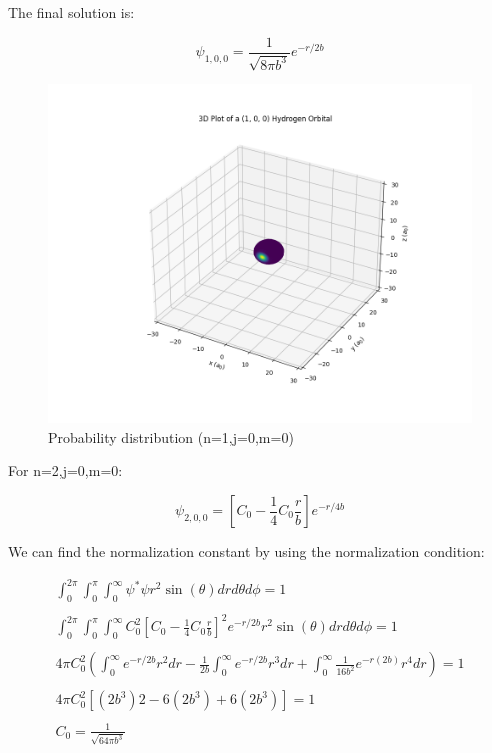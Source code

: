 The final solution is:

\begin{equation}
  \psi_{1,0,0} = \frac{1}{\sqrt{8\pi b^3}} e^{-r/2b}
\end{equation}


\begin{figure}[H]
  \centering
  \includegraphics{images9/3d_plot_1,0,0.png}
  \caption{Probability distribution (n=1,j=0,m=0)}
\end{figure}

For n=2,j=0,m=0:

\begin{equation}
  \psi_{2,0,0} = \left[C_0-\frac{1}{4}C_0 \frac{r}{b}\right] e^{-r/4b}
\end{equation}

We can find the normalization constant by using the normalization condition:

\begin{equation}
\begin{array}{c}
  \int_{0}^{2\pi}\int_{0}^{\pi}\int_{0}^{\infty} \psi^*\psi r^2 \sin(\theta) dr d\theta d\phi = 1
  \\

  \\
  \int_{0}^{2\pi}\int_{0}^{\pi}\int_{0}^{\infty} C_0^2 \left[C_0-\frac{1}{4}C_0 \frac{r}{b}\right]^2 e^{-r/2b} r^2 \sin(\theta) dr d\theta d\phi = 1
  \\

  \\
  4 \pi C_0^2 \left(\int_{0}^{\infty} e^{-r/2b} r^2 dr-\frac{1}{2b}\int_{0}^{\infty} e^{-r/2b} r^3 dr + \int_{0}^{\infty}\frac{1}{16b^2}e^{-r(2b)}r^4 dr \right) = 1
  \\

  \\
  4 \pi C_0^2 [(2b^3)2-6(2b^3)+6(2b^3)] = 1
  \\

  \\
  C_0 = \frac{1}{\sqrt{64\pi b^3}}
\end{array}
\end{equation}


